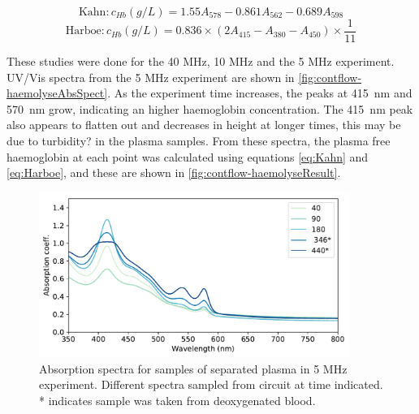 \begin{equation}
\mathrm{Kahn: } c_{Hb} (\si{g/L}) = 1.55A_{578} - 0.861A_{562} - 0.689A_{598}
\label{eq:Kahn}
\end{equation}
\begin{equation}
\mathrm{Harboe: } c_{Hb} (\si{g/L}) = 0.836 \times \left( 2A_{415} - A_{380} - A_{450}\right) \times \frac{1}{11}
\label{eq:Harboe}
\end{equation}

These studies were done for the 40 MHz, 10 MHz and the 5 MHz experiment.
UV/Vis spectra from the 5 MHz experiment are shown in \autoref{fig:contflow-haemolyseAbsSpect}.
As the experiment time increases, the peaks at \SI{415}{nm} and \SI{570}{nm} grow, indicating an higher haemoglobin concentration.
The \SI{415}{nm} peak also appears to flatten out and decreases in height at longer times, this may be due to turbidity? in the plasma samples.
From these spectra, the plasma free haemoglobin at each point was calculated using equations \ref{eq:Kahn} and \ref{eq:Harboe}, and these are shown in \autoref{fig:contflow-haemolyseResult}.

\begin{figure}[ht]
\centering
\includegraphics[width=0.9\textwidth]{figures/contflow/haemolyseAbsSpect.pdf}
\caption[Absorption spectra for samples of separated plasma in 5 MHz experiment]{Absorption spectra for samples of separated plasma in 5 MHz experiment. Different spectra sampled from circuit at time indicated. * indicates sample was taken from deoxygenated blood.}
\label{fig:contflow-haemolyseAbsSpect}
\end{figure}

